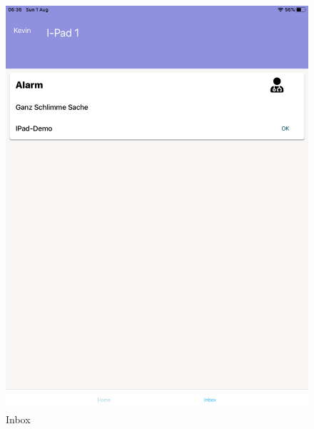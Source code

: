 \begin{figure}[h]
\begin{minipage}[b]{0.4\textwidth}
        \includegraphics[width=\textwidth]{graphics/screenshots/mobileclient/screenshots-inbox}
        \caption{Inbox}
    \end{minipage}
    \label{fig:MobileClient-Screens2}
\end{figure}

\clearpage
